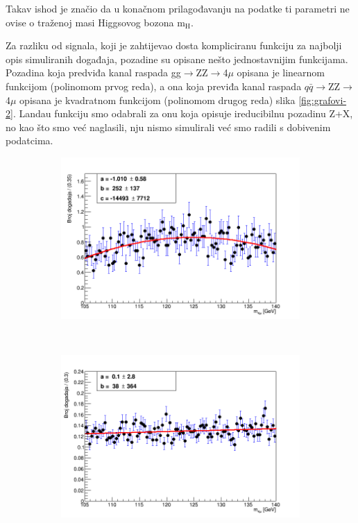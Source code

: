 \documentclass[12pt,a4paper,oneside]{article}
\begin{document}
\begin{linenumbers}
		
		Takav ishod je značio da u konačnom prilagođavanju na podatke ti parametri ne ovise o traženoj masi Higgsovog bozona m$_{\mathrm{H}}$.
		
		Za razliku od signala, koji je zahtijevao dosta kompliciranu funkciju za najbolji opis simuliranih događaja, pozadine su opisane nešto jednostavnijim funkcijama.
		Pozadina koja predviđa kanal raspada gg$\rightarrow$ZZ$\rightarrow$4$\mu$ opisana je linearnom funkcijom (polinomom prvog reda),  a ona koja previđa kanal raspada $q\bar{q}$$\rightarrow$ZZ$\rightarrow$4$\mu$ opisana je kvadratnom funkcijom (polinomom drugog reda) slika \ref{fig:grafovi-2}. Landau funkciju smo odabrali za onu koja opisuje ireducibilnu pozadinu Z+X, no kao što smo već naglasili, nju nismo simulirali već smo radili s dobivenim podatcima.
		
				\begin{figure}[H]
			\centering
			\begin{subfigure}[b]{0.9\textwidth}
				\includegraphics[width=\textwidth]{background-qqZZ-weighted.png}
				\caption{}
				\label{fig:bckg-zz}
			\end{subfigure}
			~ %
			\begin{subfigure}[b]{0.9\textwidth}
				\includegraphics[width=\textwidth]{background-ggto4mu-weighted.png}

\end{subfigure}
\end{figure}
\end{linenumbers}
\end{document}
